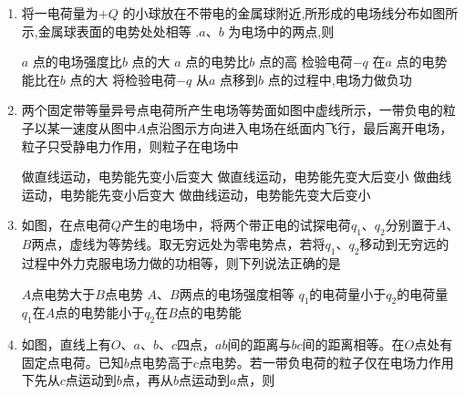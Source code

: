 \begin{enumerate}[leftmargin=0em]
\item
{}
将一电荷量为$ +Q $ 的小球放在不带电的金属球附近,所形成的电场线分布如图所示,金属球表面的电势处处相等 $. a $、$ b $ 为电场中的两点,则  
\begin{figure}[h!]
\centering

\end{figure}


\fourchoices
{$a $ 点的电场强度比$ b $ 点的大}
{$a $ 点的电势比$ b $ 点的高}
{检验电荷$ -q $ 在$ a $ 点的电势能比在$ b $ 点的大}
{将检验电荷$ -q $ 从$ a $ 点移到$ b $ 点的过程中,电场力做负功}





\item
{}
两个固定带等量异号点电荷所产生电场等势面如图中虚线所示，一带负电的粒子以某一速度从图中$ A $点沿图示方向进入电场在纸面内飞行，最后离开电场，粒子只受静电力作用，则粒子在电场中  
\begin{figure}[h!]
\centering

\end{figure}



\fourchoices
{做直线运动，电势能先变小后变大}
{做直线运动，电势能先变大后变小}
{做曲线运动，电势能先变小后变大}
{做曲线运动，电势能先变大后变小}




\item
{}
如图，在点电荷$ Q $产生的电场中，将两个带正电的试探电荷$ q_{1} $、$ q_{2} $分别置于$ A $、$ B $两点，虚线为等势线。取无穷远处为零电势点，若将$ q_{1} $、$ q_{2} $移动到无穷远的过程中外力克服电场力做的功相等，则下列说法正确的是  
\begin{figure}[h!]
\centering

\end{figure}


\fourchoices
{$ A $点电势大于$ B $点电势}
{$ A $、$ B $两点的电场强度相等}
{$ q_{1} $的电荷量小于$ q_{2} $的电荷量}
{$ q_{1} $在$ A $点的电势能小于$ q_{2} $在$ B $点的电势能}




\item
{}
如图，直线上有$ O $、$ a $、$ b $、$ c $四点，$ ab $间的距离与$ bc $间的距离相等。在$ O $点处有固定点电荷。已知$ b $点电势高于$ c $点电势。若一带负电荷的粒子仅在电场力作用下先从$ c $点运动到$ b $点，再从$ b $点运动到$ a $点，则  
\begin{figure}[h!]
\centering

\end{figure}



\end{enumerate}
